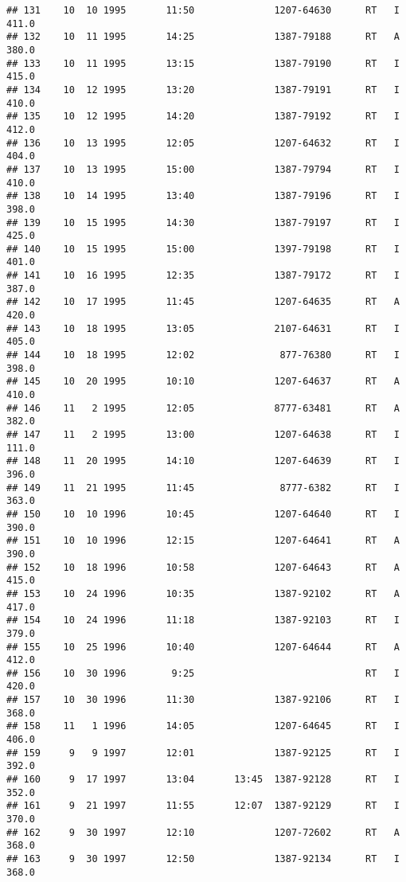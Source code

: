 \documentclass[
]{article}
\begin{document}
\begin{verbatim}
## 131    10  10 1995       11:50              1207-64630      RT   I     411.0
## 132    10  11 1995       14:25              1387-79188      RT   A     380.0
## 133    10  11 1995       13:15              1387-79190      RT   I     415.0
## 134    10  12 1995       13:20              1387-79191      RT   I     410.0
## 135    10  12 1995       14:20              1387-79192      RT   I     412.0
## 136    10  13 1995       12:05              1207-64632      RT   I     404.0
## 137    10  13 1995       15:00              1387-79794      RT   I     410.0
## 138    10  14 1995       13:40              1387-79196      RT   I     398.0
## 139    10  15 1995       14:30              1387-79197      RT   I     425.0
## 140    10  15 1995       15:00              1397-79198      RT   I     401.0
## 141    10  16 1995       12:35              1387-79172      RT   I     387.0
## 142    10  17 1995       11:45              1207-64635      RT   A     420.0
## 143    10  18 1995       13:05              2107-64631      RT   I     405.0
## 144    10  18 1995       12:02               877-76380      RT   I     398.0
## 145    10  20 1995       10:10              1207-64637      RT   A     410.0
## 146    11   2 1995       12:05              8777-63481      RT   A     382.0
## 147    11   2 1995       13:00              1207-64638      RT   I     111.0
## 148    11  20 1995       14:10              1207-64639      RT   I     396.0
## 149    11  21 1995       11:45               8777-6382      RT   I     363.0
## 150    10  10 1996       10:45              1207-64640      RT   I     390.0
## 151    10  10 1996       12:15              1207-64641      RT   A     390.0
## 152    10  18 1996       10:58              1207-64643      RT   A     415.0
## 153    10  24 1996       10:35              1387-92102      RT   A     417.0
## 154    10  24 1996       11:18              1387-92103      RT   I     379.0
## 155    10  25 1996       10:40              1207-64644      RT   A     412.0
## 156    10  30 1996        9:25                              RT   I     420.0
## 157    10  30 1996       11:30              1387-92106      RT   I     368.0
## 158    11   1 1996       14:05              1207-64645      RT   I     406.0
## 159     9   9 1997       12:01              1387-92125      RT   I     392.0
## 160     9  17 1997       13:04       13:45  1387-92128      RT   I     352.0
## 161     9  21 1997       11:55       12:07  1387-92129      RT   I     370.0
## 162     9  30 1997       12:10              1207-72602      RT   A     368.0
## 163     9  30 1997       12:50              1387-92134      RT   I     368.0

\end{verbatim}
\end{document}
